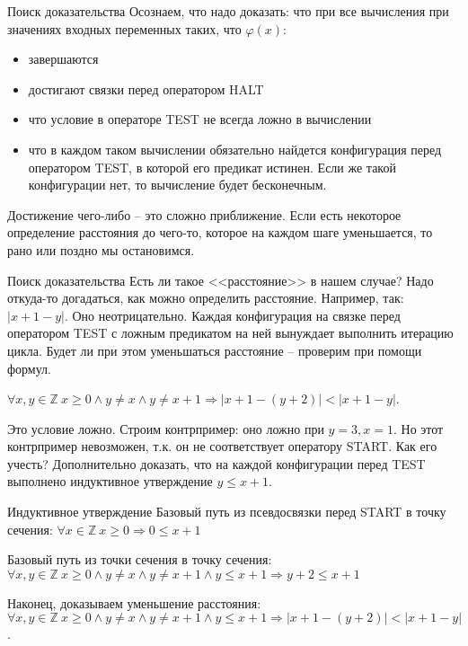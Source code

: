 \documentclass[hyperref={unicode=true}]{beamer}
\begin{document}
    \begin{frame}{Поиск доказательства}
    Осознаем, что надо доказать: что при все вычисления при значениях входных переменных таких, что $\varphi(x)$:
    \begin{itemize}
    \item завершаются
    \item достигают связки перед оператором HALT
    \item что условие в операторе TEST не всегда ложно в вычислении
    \item что в каждом таком вычислении обязательно найдется конфигурация перед оператором TEST, в которой его предикат истинен. Если же такой конфигурации нет, то вычисление будет бесконечным.
    \end{itemize}

    Достижение чего-либо -- это сложно приближение. Если есть некоторое определение расстояния до чего-то, которое на каждом шаге уменьшается, то рано или поздно мы остановимся.
    \end{frame}

    \begin{frame}{Поиск доказательства}
    Есть ли такое <<расстояние>> в нашем случае? Надо откуда-то догадаться, как можно определить расстояние. Например, так: $|x + 1 - y|$. Оно неотрицательно. Каждая конфигурация на связке перед оператором TEST с ложным предикатом на ней вынуждает выполнить итерацию цикла. Будет ли при этом уменьшаться расстояние -- проверим при помощи формул.

    $\forall x, y \in \mathbb{Z} ~ x \geq 0 \land y \neq x \land y \neq x + 1 \Rightarrow |x + 1 - (y + 2)| < |x + 1 - y|$.

    Это условие ложно. Строим контрпример: оно ложно при $y = 3, x = 1$. Но этот контрпример невозможен, т.к. он не соответствует оператору START. Как его учесть? Дополнительно доказать, что на каждой конфигурации перед TEST выполнено индуктивное утверждение $y \leq x + 1$.
    \end{frame}

    \begin{frame}{Индуктивное утверждение}
    Базовый путь из псевдосвязки перед START в точку сечения: $\forall x \in \mathbb{Z} ~ x \geq 0 \Rightarrow 0 \leq x + 1$

    Базовый путь из точки сечения в точку сечения: $\forall x, y \in \mathbb{Z} ~ x \geq 0 \land y \neq x \land y \neq x + 1 \land y \leq x + 1 \Rightarrow y + 2 \leq x + 1$

    Наконец, доказываем уменьшение расстояния:
    $\forall x, y \in \mathbb{Z} ~ x \geq 0 \land y \neq x \land y \neq x + 1 \land y \leq x + 1 \Rightarrow |x + 1 - (y + 2)| < |x + 1 - y|$.
    \end{frame}
\end{document}
